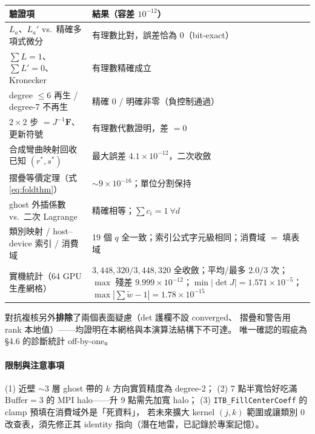\documentclass[11pt,a4paper]{article}
\newcommand{\code}[1]{\texttt{#1}}
\begin{document}
\begin{center}
\begin{tabular}{@{}p{}p{}@{}}
\toprule
\textbf{驗證項} & \textbf{結果（容差 $10^{-12}$）}\\
\midrule
$L_a$、$L_a'$ vs.\ 精確多項式微分 & 有理數比對，誤差恰為 $0$（bit-exact）\\
$\sum L=1$、$\sum L'=0$、Kronecker & 有理數精確成立\\
degree $\le6$ 再生 / degree-7 不再生 & 精確 $0$ / 明確非零（負控制通過）\\
$2\times2$ 步 $=J^{-1}\bm{F}$、更新符號 & 有理數代數證明，差 $=0$\\
合成彎曲映射回收已知 $(r^*,s^*)$ & 最大誤差 $4.1\times10^{-12}$，二次收斂\\
摺疊等價定理（式 \eqref{eq:foldthm}） & $\sim9\times10^{-16}$；單位分割保持\\
ghost 外插係數 vs.\ 二次 Lagrange & 精確相等；$\sum c_i=1\ \forall d$\\
類別映射 / host--device 索引 / 消費域 & 19 個 $q$ 全一致；索引公式字元級相同；消費域 $=$ 填表域\\
\midrule
實機統計（64 GPU 生產網格） &
$3{,}448{,}320/3{,}448{,}320$ 全收斂；平均/最多 $2.0/3$ 次；
$\max$ 殘差 $9.999\times10^{-12}$；$\min|\det J|=1.571\times10^{-5}$；
$\max|\sum\tilde w-1|=1.78\times10^{-15}$\\
\bottomrule
\end{tabular}
\end{center}

對抗複核另外\textbf{排除}了兩個表面疑慮（det 護欄不設 converged、
摺疊和警告用 rank 本地值）——均證明在本網格與本演算法結構下不可達。
唯一確認的瑕疵為 \S4.6 的診斷統計 off-by-one。

\paragraph{限制與注意事項}
(1) 近壁 $\sim$3 層 ghost 帶的 $k$ 方向實質精度為 degree-2；
(2) 7 點半寬恰好吃滿 $\mathrm{Buffer}=3$ 的 MPI halo——升 9 點需先加寬 halo；
(3) \code{ITB\_FillCenterCoeff} 的 clamp 預填在消費域外是「死資料」，
若未來擴大 kernel $(j,k)$ 範圍或讓類別 0 改查表，須先修正其 identity
指向（潛在地雷，已記錄於專案記憶）。
\end{document}
